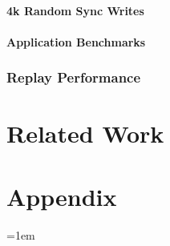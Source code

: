 \documentclass[12pt,a4paper,twoside]{book}
\begin{document}
\subsubsection{4k Random Sync Writes}
\subsubsection{Application Benchmarks}
\subsection{Replay Performance}

\chapter{Related Work}

\backmatter

\chapter{Appendix}\label{ch:appendix}

\cleardoublepage
{}
{}
\emergencystretch=1em
\printbibliography
\end{document}
